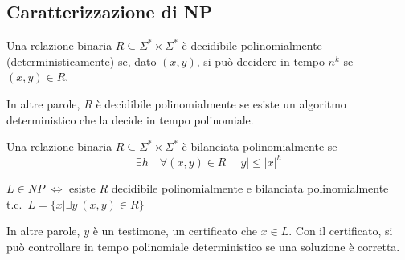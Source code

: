 \subsection{Caratterizzazione di NP}

\begin{definition}
    Una relazione binaria $R\subseteq\Sigma^*\times\Sigma^*$ è decidibile polinomialmente (deterministicamente) se, dato $(x,y)$, si può decidere in tempo $n^k$ se $(x,y)\in R$.
\end{definition}
In altre parole, $R$ è decidibile polinomialmente se esiste un algoritmo deterministico che la decide in tempo polinomiale.
\begin{definition}
    Una relazione binaria $R\subseteq\Sigma^*\times\Sigma^*$ è bilanciata polinomialmente se 
    $$
        \exists h \quad \forall(x,y)\in R \quad |y|\leq |x|^h
    $$
\end{definition}

\begin{theorem}
    $L\in NP$ $\Leftrightarrow$ esiste $R$ decidibile polinomialmente e bilanciata polinomialmente t.c.~$L=\{x|\exists y~(x,y)\in R\}$
\end{theorem}
In altre parole, $y$ è un testimone, un certificato che $x\in L$. Con il certificato, si può controllare in tempo polinomiale deterministico se una soluzione è corretta.


